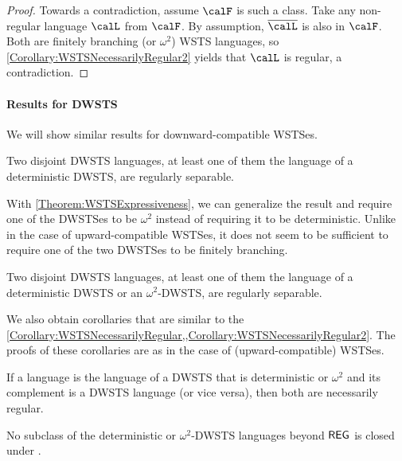 \documentclass[../../diss.tex]{subfiles}
\begin{document}
\begin{proof}
    Towards a contradiction, assume $\calF$ is such a class.
    Take any non-regular language $\calL$ from $\calF$.
    By assumption, $\overline{\calL}$ is also in $\calF$.
    Both are finitely branching (or $\omega^2$) WSTS languages, so \cref{Corollary:WSTSNecessarilyRegular2} yields that $\calL$ is regular, a contradiction.
\end{proof}

\paragraph{Results for DWSTS}

We will show similar results for downward-compatible WSTSes.

\begin{theorem}%
\label{Theorem:DWSTSSeparability}%
    Two disjoint DWSTS languages, at least one of them the language of a deterministic DWSTS, are regularly separable.
\end{theorem}

With \cref{Theorem:WSTSExpressiveness}, we can generalize the result and require one of the DWSTSes to be $\omega^2$ instead of requiring it to be deterministic.
Unlike in the case of upward-compatible WSTSes, it does not seem to be sufficient to require one of the two DWSTSes to be finitely branching.

\begin{corollary}
    Two disjoint DWSTS languages, at least one of them the language of a deterministic DWSTS or an $\omega^2$-DWSTS, are regularly separable.
\end{corollary}

We also obtain corollaries that are similar to the \cref{Corollary:WSTSNecessarilyRegular,,Corollary:WSTSNecessarilyRegular2}.
The proofs of these corollaries are as in the case of (upward-compatible) WSTSes.

\begin{corollary}
    \begin{thmenumerate}[a)]
        \item If a language is the language of a DWSTS that is deterministic or $\omega^2$ and its complement is a DWSTS language (or vice versa), then both are necessarily regular.
        \item
        No subclass of the deterministic or $\omega^2$-DWSTS languages beyond ${\mathsf{REG}}$ is closed under .
    \end{thmenumerate}
\end{corollary}
\end{document}
